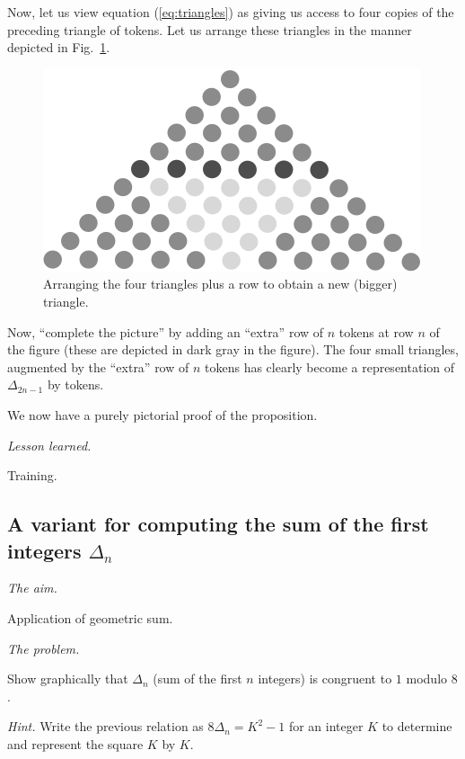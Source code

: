 Now, let us view equation (\ref{eq:triangles}) as giving us access to four
copies of the preceding triangle of tokens.  Let us arrange these
triangles in the manner depicted in Fig.~\ref{fig:Delta(n)4}.
\begin{figure}[ht]
\begin{center}
       \includegraphics[scale=0.5]{FiguresMaths/Delta4}
 \caption{Arranging the four triangles plus a row to obtain a new (bigger) triangle.}
       \label{fig:Delta(n)4}
\end{center}
\end{figure}
Now, ``complete the picture'' by adding an ``extra'' row of $n$
tokens at row $n$ of the figure (these are depicted in dark gray in
the figure).  The four small triangles, augmented by the ``extra'' row
of $n$ tokens has clearly become a representation  of $\Delta_{2n-1}$
by tokens.

We now have a purely pictorial proof of the proposition. 
\medskip

\noindent \textit{Lesson learned.}

Training.


\subsection{A variant for computing the sum of the first integers $\Delta_n$}

\noindent \textit{The aim.}

Application of geometric sum.
\medskip

\noindent \textit{The problem.}

Show graphically that $\Delta_n$ (sum of the first $n$ integers) is congruent to $1$ modulo $8$.
\medskip

\noindent \textit{Hint.}
Write the previous relation as $8 \Delta_n = K^2 -1$
for an integer $K$ to determine and represent the square $K$ by $K$. 

